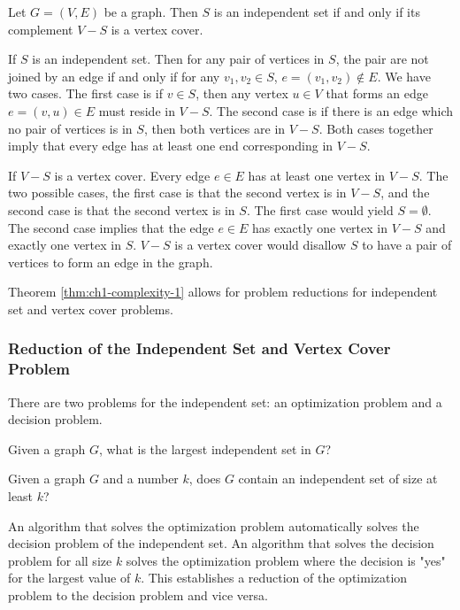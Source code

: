 {\begin{thm}\label{thm:ch1-complexity-1}
Let $G = (V,E)$ be a graph.  Then $S$ is an independent set if and only if its complement $V-S$ is a vertex cover.
\end{thm}
\begin{pf}
If $S$ is an independent set. Then for any pair of vertices in $S$, the pair are not joined by an edge if and only if for any $v_1, v_2 \in S$, $e = \left( v_1, v_2 \right) \not \in E$.  We have two cases.  The first case is if $v \in S$, then any vertex $u \in V$ that forms an edge $e = (v,u) \in E$ must reside in $V-S$. The second case is if there is an edge which no pair of vertices is in $S$, then both vertices are in $V-S$.  Both cases together imply that every edge has at least one end corresponding in $V-S$. 


If $V-S$ is a vertex cover.  Every edge $e \in E$ has at least one vertex in $V-S$.  The two possible cases, the first case is that the second vertex is in $V-S$, and the second case is that the second vertex is in $S$.  The first case would yield $S = \emptyset$.  The second case implies that the edge $e \in E$ has exactly one vertex in $V-S$ and exactly one vertex in $S$.  $V-S$ is a vertex cover would disallow $S$ to have a pair of vertices to form an edge in the graph.
\end{pf}
Theorem \ref{thm:ch1-complexity-1} allows for problem reductions for independent set and vertex cover problems.
\subsubsection{Reduction of the Independent Set and Vertex Cover Problem}
There are two problems for the independent set: an optimization problem and a decision problem.
\begin{prob}
Given a graph $G$, what is the largest independent set in $G$?
\end{prob}
\begin{prob}
Given a graph $G$ and a number $k$, does $G$ contain an independent set of size at least $k$?
\end{prob}
An algorithm that solves the optimization problem automatically solves the decision problem of the independent set.  An algorithm that solves the decision problem for all size $k$ solves the optimization problem where the decision is "yes" for the largest value of $k$.  This establishes a reduction of the optimization problem to the decision problem and vice versa. 
}
